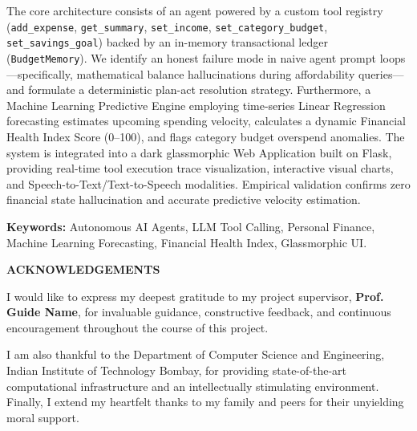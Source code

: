 \documentclass[12pt,a4paper,oneside]{report}
\begin{document}
The core architecture consists of an agent powered by a custom tool registry (\texttt{add\_expense}, \texttt{get\_summary}, \texttt{set\_income}, \texttt{set\_category\_budget}, \texttt{set\_savings\_goal}) backed by an in-memory transactional ledger (\texttt{BudgetMemory}). We identify an honest failure mode in naive agent prompt loops—specifically, mathematical balance hallucinations during affordability queries—and formulate a deterministic plan-act resolution strategy. Furthermore, a Machine Learning Predictive Engine employing time-series Linear Regression forecasting estimates upcoming spending velocity, calculates a dynamic Financial Health Index Score (0--100), and flags category budget overspend anomalies. The system is integrated into a dark glassmorphic Web Application built on Flask, providing real-time tool execution trace visualization, interactive visual charts, and Speech-to-Text/Text-to-Speech modalities. Empirical validation confirms zero financial state hallucination and accurate predictive velocity estimation.

\vspace{0.5cm}
\noindent \textbf{Keywords:} Autonomous AI Agents, LLM Tool Calling, Personal Finance, Machine Learning Forecasting, Financial Health Index, Glassmorphic UI.

\newpage

\thispagestyle{plain}
\begin{center}
    \Large \textbf{ACKNOWLEDGEMENTS}
\end{center}

\vspace{0.5cm}

\noindent I would like to express my deepest gratitude to my project supervisor, \textbf{Prof. Guide Name}, for invaluable guidance, constructive feedback, and continuous encouragement throughout the course of this project.

I am also thankful to the Department of Computer Science and Engineering, Indian Institute of Technology Bombay, for providing state-of-the-art computational infrastructure and an intellectually stimulating environment. Finally, I extend my heartfelt thanks to my family and peers for their unyielding moral support.

\vspace{1.5cm}
\end{document}
